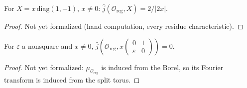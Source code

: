 \begin{lemma}
\label{jHat_regOrbit_split}
\leanok
{}
For $X=x\,\mathrm{diag}(1,-1)$, $x\neq0$: $\hat j(\mathcal O_{\mathrm{reg}},X)=2/|2x|$.
\end{lemma}
\begin{proof}
Not yet formalized (hand computation, every residue characteristic).
\end{proof}

\begin{lemma}
\label{jHat_regOrbit_elliptic}
\leanok
{}
For $\varepsilon$ a nonsquare and $x\neq0$, $\hat j(\mathcal O_{\mathrm{reg}},x\begin{pmatrix}0&1\\\varepsilon&0\end{pmatrix})=0$.
\end{lemma}
\begin{proof}
Not yet formalized: $\mu_{\mathcal O_{\mathrm{reg}}}$ is induced from the Borel, so its Fourier transform is induced from the split torus.
\end{proof}

